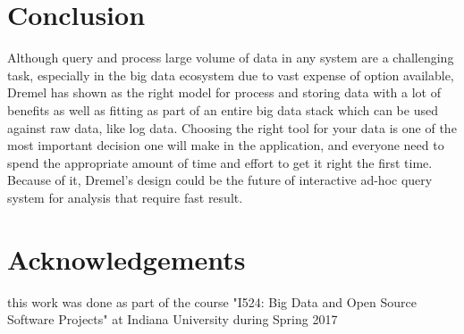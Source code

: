 \documentclass[9pt,twocolumn,twoside]{styles/osajnl}
\begin{document}
\section{Conclusion}
 Although query and process large volume of data in any system are a challenging task, especially in the big data ecosystem due to vast expense of option available, Dremel has shown as the right model for process and storing data with a lot of benefits as well as fitting as part of an entire big data stack which can be used against raw data, like log data.  Choosing the right tool for your data is one of the most important decision one will make in the application, and everyone need to spend the appropriate amount of time and effort to get it right the first time. Because of it,  Dremel's design could be the future of interactive ad-hoc query system for analysis that require fast result. 
 
 \section{Acknowledgements}
this work was done as part of the course "I524: Big Data and Open Source Software Projects" at Indiana University during Spring 2017




 
\end{document}
